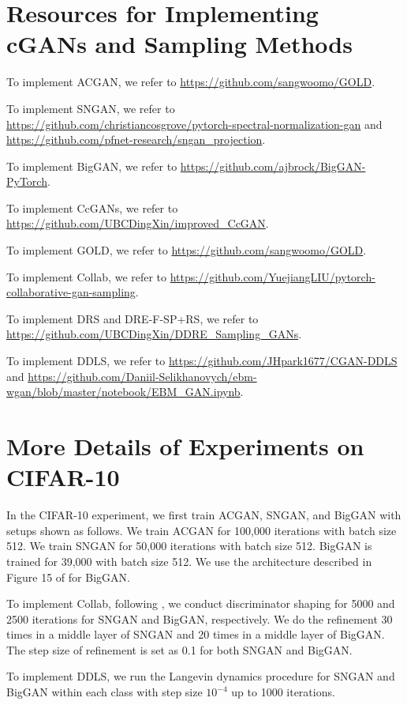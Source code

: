 \documentclass[final,12pt, 3p,times]{elsarticle}
\begin{document}
\section{Resources for Implementing cGANs and Sampling Methods}\label{supp:resources}

To implement ACGAN, we refer to \url{https://github.com/sangwoomo/GOLD}.

To implement SNGAN, we refer to \url{https://github.com/christiancosgrove/pytorch-spectral-normalization-gan} and \url{https://github.com/pfnet-research/sngan_projection}. 

To implement BigGAN, we refer to \url{https://github.com/ajbrock/BigGAN-PyTorch}. 

To implement CcGANs, we refer to \url{https://github.com/UBCDingXin/improved_CcGAN}.

To implement GOLD, we refer to \url{https://github.com/sangwoomo/GOLD}.

To implement Collab, we refer to \url{https://github.com/YuejiangLIU/pytorch-collaborative-gan-sampling}.

To implement DRS and DRE-F-SP+RS, we refer to \url{https://github.com/UBCDingXin/DDRE_Sampling_GANs}. 

To implement DDLS, we refer to \url{https://github.com/JHpark1677/CGAN-DDLS} and \url{https://github.com/Daniil-Selikhanovych/ebm-wgan/blob/master/notebook/EBM_GAN.ipynb}. 

\section{More Details of Experiments on CIFAR-10}\label{supp:details_of_cifar10}

In the CIFAR-10 experiment, we first train ACGAN, SNGAN, and BigGAN with setups shown as follows. We train ACGAN for 100,000 iterations with batch size 512. We train SNGAN for 50,000 iterations with batch size 512. BigGAN is trained for 39,000 with batch size 512. We use the architecture described in Figure 15 of \cite{brock2018large} for BigGAN.

To implement Collab, following \cite{liu2020collaborative}, we conduct discriminator shaping for 5000 and 2500 iterations for SNGAN and BigGAN, respectively. We do the refinement 30 times in a middle layer of SNGAN and 20 times in a middle layer of BigGAN. The step size of refinement is set as 0.1 for both SNGAN and BigGAN. 

To implement DDLS, we run the Langevin dynamics procedure for SNGAN and BigGAN within each class with step size $10^{-4}$ up to 1000 iterations.
\end{document}
